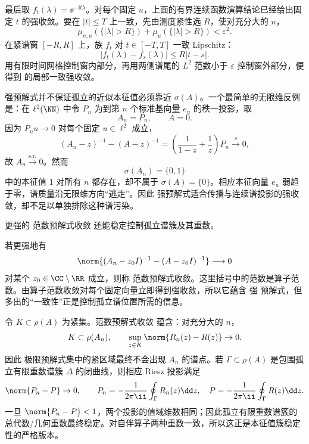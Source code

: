 最后取 $f_t(\lambda)=\ee^{-\ii t\lambda}$。对每个固定 $u$，上面的有界连续函数演算结论已经给出固定 $t$ 的强收敛。要在 $|t|\le T$ 上一致，先由测度紧性选 $R$，使对充分大的 $n$，
\[
 \mu_{n,u}(\{|\lambda|>R\})+\mu_u(\{|\lambda|>R\})<\varepsilon^2.
\]
在紧谱窗 $[-R,R]$ 上，族 $f_t$ 对 $t\in[-T,T]$ 一致 Lipschitz：
\[
 |f_t(\lambda)-f_s(\lambda)|\le R|t-s|.
\]
用有限时间网格控制窗内部分，再用两侧谱尾的 $L^2$ 范数小于 $\varepsilon$ 控制窗外部分，便得到 的局部一致强收敛。

强预解式并不保证孤立的近似本征值必须靠近 $\sigma(A)$。一个最简单的无限维反例是：在 $\ell^2(\NN)$ 中令 $P_n$ 为到第 $n$ 个标准基向量 $e_n$ 的秩一投影，取
\[
 A_n=P_n,
 \qquad A=0.
\]
因为 $P_nu\to0$ 对每个固定 $u\in\ell^2$ 成立，
\[
 (A_n-z)^{-1}-(A-z)^{-1}
 =\left(\frac1{1-z}+\frac1z\right)P_n
 \xrightarrow{s}0,
\]
故 $A_n\xrightarrow{\mathrm{s.r.}}0$。然而
\[
 \sigma(A_n)=\{0,1\}
\]
中的本征值 $1$ 对所有 $n$ 都存在，却不属于 $\sigma(A)=\{0\}$。相应本征向量 $e_n$ 弱趋于零，谱质量沿无限维方向“逃走”。因此 强预解式适合传播与连续谱投影的强收敛，却不足以单独排除这种谱污染。

更强的 范数预解式收敛 还能稳定控制孤立谱簇及其重数。

若更强地有
\begin{equation}\label{eq:math-sl-norm-resolvent-def}
 \norm{(A_n-z_0I)^{-1}-(A-z_0I)^{-1}}\longrightarrow0
\end{equation}
对某个 $z_0\in\CC\setminus\RR$ 成立，则称 范数预解式收敛。这里括号中的范数是算子范数。由算子范数收敛对每个固定向量立即得到强收敛，所以它蕴含 强 预解式，但多出的“一致性”正是控制孤立谱位置所需的信息。

令 $K\subset\rho(A)$ 为紧集。范数预解式收敛 蕴含：对充分大的 $n$，
\begin{equation}\label{eq:math-sl-norm-resolvent-set-stability}
 K\subset\rho(A_n),
 \qquad
 \sup_{z\in K}\norm{R_n(z)-R(z)}\to0.
\end{equation}
因此 极限预解式集中的紧区域最终不会出现 $A_n$ 的谱点。若 $\Gamma\subset\rho(A)$ 是包围孤立有限重数谱簇 $\Delta$ 的闭曲线，则相应 Riesz 投影满足
\begin{equation}\label{eq:math-sl-riesz-projection-norm-convergence}
 \norm{P_n-P}\to0,
 \qquad
 P_n=-\frac1{2\pi\ii}\oint_\Gamma R_n(z)\dd z,
 \quad
 P=-\frac1{2\pi\ii}\oint_\Gamma R(z)\dd z.
\end{equation}
一旦 $\norm{P_n-P}<1$，两个投影的值域维数相同；因此孤立有限重数谱簇的总代数/几何重数最终稳定。对自伴算子两种重数一致，所以这正是本征值簇稳定性的严格版本。

